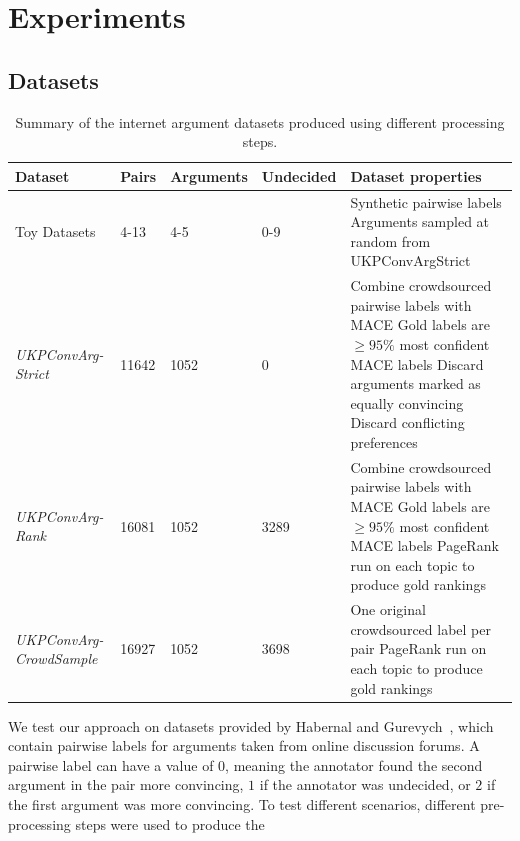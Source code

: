 \section{Experiments}\label{sec:expts}

\subsection{Datasets}
\begin{table}
\small
  \begin{tabularx}{\textwidth}{ p{2.2cm} | p{1cm} p{1.5cm} p{1.6cm} X }
  Dataset & Pairs & Arguments & Undecided & Dataset properties \\\hline\hline
  Toy Datasets & 4-13 & 4-5 & 0-9 & Synthetic pairwise labels
  \newline Arguments sampled at random from UKPConvArgStrict\\  
  \hline\emph{UKPConvArg-Strict} &
  11642 &
  1052 & 
  0 &
  Combine crowdsourced pairwise labels with MACE \newline
  Gold labels are $\ge 95\%$ most confident MACE labels \newline
  Discard arguments marked as equally convincing \newline
  Discard conflicting preferences \\
  \hline\emph{UKPConvArg-Rank} &
  16081 &
  1052 &
  3289 &
  Combine crowdsourced pairwise labels with MACE \newline
  Gold labels are $\ge 95\%$ most confident MACE labels \newline
  PageRank run on each topic to produce gold rankings \\  
  \hline\emph{UKPConvArg-CrowdSample} &
  16927 & 
  1052 &
  3698 &
  One original crowdsourced label per pair\newline
  PageRank run on each topic to produce gold rankings
  \end{tabularx}
  \caption{\label{tab:expt_data} Summary of the internet argument datasets produced using different processing steps.}
\end{table}
We test our approach on datasets provided by Habernal and Gurevych~,
which contain pairwise labels for arguments taken from online discussion forums.
A pairwise label can have a value of $0$, meaning the annotator found the second argument in the pair more convincing,
$1$ if the annotator was undecided, or $2$ if the first argument was more convincing.
To test different scenarios, different pre-processing steps were used to produce the
